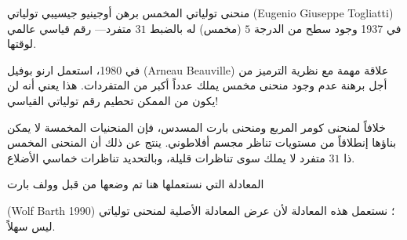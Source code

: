 \begin{surferPage}{منحنى تولياتي المخمس}
    برهن أوجينيو جيسيبي تولياتي %
    \textenglish{(Eugenio Giuseppe Togliatti)} %
   في 1937 وجود سطح من الدرجة $5$ (مخمس) له بالضبط $31$ متفرد--- رقم قياسي عالمي لوقتها.

    في 1980، استعمل ارنو بوفيل %
    \textenglish{(Arneau Beauville)} %
     علاقة مهمة مع نظرية الترميز من أجل برهنة عدم وجود منحنى مخمس يملك عدداً أكبر من المتفردات.
    هذا يعني أنه لن يكون من الممكن تحطيم رقم تولياتي القياسي!

   خلافاً لمنحنى كومر المربع ومنحنى بارت المسدس، فإن المنحنيات المخمسة لا يمكن بناؤها إنطلاقاً من مستويات تناظر مجسم أفلاطوني. ينتج عن ذلك أن المنحنى المخمس ذا $31$ متفرد لا يملك سوى تناظرات قليلة، وبالتحديد تناظرات خماسي الأضلاع.

    المعادلة التي نستعملها هنا تم وضعها من قبل وولف بارت %

    \textenglish{(Wolf Barth 1990)}%
    ؛ نستعمل هذه المعادلة لأن عرض المعادلة الأصلية لمنحنى تولياتي ليس سهلاً.
\end{surferPage}
